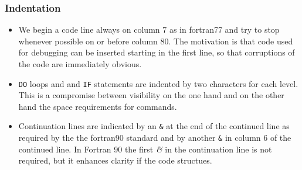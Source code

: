 \documentclass[a4paper,10pt]{report}
\begin{document}
\subsubsection{Indentation}
\begin{itemize}
\item We begin a code line always on column 7 as in fortran77 and try to
stop whenever possible on or before column 80. The motivation is that
code used for debugging can be inserted starting in the first line, so
that corruptions of the code are immediately obvious.

\item \texttt{DO} loops and and \texttt{IF} statements are indented by two
characters for each level. This is a compromise between visibility on
the one hand and on the other hand the space requirements for
commands.

\item Continuation lines are indicated by an \texttt{\&} at the end of the
continued line as required by the the fortran90 standard and by
another \texttt{\&} in column 6 of the continued line. In Fortran 90
the first \textit{\&} in the continuation line is not required, but it
enhances clarity if the code structues.
\end{itemize}

%
\end{document}

